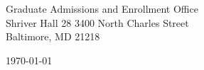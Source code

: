 \begin{minipage}{0.49\textwidth}
\begin{flushleft}
\noindent 
Graduate Admissions and Enrollment Office\\
Shriver Hall 28  3400 North Charles Street \\
Baltimore, MD 21218
\end{flushleft}
\end{minipage}
\begin{minipage}{0.47\textwidth}
\begin{flushright}
\today
\end{flushright}
\end{minipage} \\

\newcommand{\univ}{The Johns Hopkins University}
\newcommand{\univshort}{JHU}
\newcommand{\degree}{M.Sc.}
\newcommand{\dept}{Computer Science}
